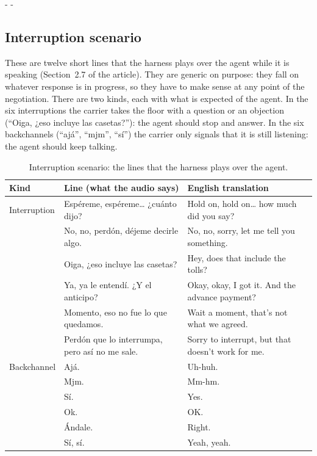 \documentclass[11pt]{article}
\makeatletter
\newcommand{\need}[1]{\par\penalty-100\begingroup
  \setlength{\dimen@}{#1}%
  \dimen@ii\pagegoal \advance\dimen@ii-\pagetotal
  \ifdim\dimen@>\dimen@ii \ifdim\dimen@ii>\z@\vfil\fi \penalty-\@M \fi
  \endgroup}
\makeatother
\begin{document}
\need{12.5cm}
\subsection{Interruption scenario}

These are twelve short lines that the harness plays over the agent while it is
speaking (Section~2.7 of the article). They are generic on purpose: they fall on
whatever response is in progress, so they have to make sense at any point of the
negotiation. There are two kinds, each with what is expected of the agent. In the
six interruptions the carrier takes the floor with a question or an objection
(``Oiga, ¿eso incluye las casetas?''): the agent should stop and answer. In the six
backchannels (``ajá'', ``mjm'', ``sí'') the carrier only signals that it is still
listening: the agent should keep talking.

\begin{table}[H]
\centering
\caption{Interruption scenario: the lines that the harness plays over the agent.}
\label{tab:guion-int}
\footnotesize
\renewcommand{\arraystretch}{1.15}
\setlength{\tabcolsep}{4pt}
\begin{tabular}{@{}P{2.1cm}P{6.4cm}P{\dimexpr\linewidth-8.5cm-4\tabcolsep\relax}@{}}
\toprule
\textbf{Kind} & \textbf{Line (what the audio says)} & \textbf{English translation}\\
\midrule
Interruption & Espéreme, espéreme… ¿cuánto dijo? & Hold on, hold on… how much did you say?\\
 & No, no, perdón, déjeme decirle algo. & No, no, sorry, let me tell you something.\\
 & Oiga, ¿eso incluye las casetas? & Hey, does that include the tolls?\\
 & Ya, ya le entendí. ¿Y el anticipo? & Okay, okay, I got it. And the advance payment?\\
 & Momento, eso no fue lo que quedamos. & Wait a moment, that's not what we agreed.\\
 & Perdón que lo interrumpa, pero así no me sale. & Sorry to interrupt, but that doesn't work for me.\\
Backchannel & Ajá. & Uh-huh.\\
 & Mjm. & Mm-hm.\\
 & Sí. & Yes.\\
 & Ok. & OK.\\
 & Ándale. & Right.\\
 & Sí, sí. & Yeah, yeah.\\
\bottomrule
\end{tabular}
\end{table}
\end{document}
